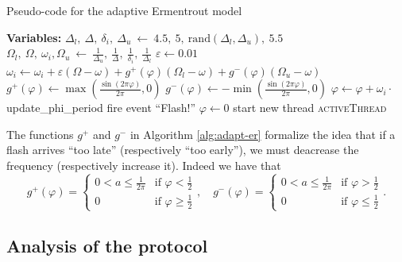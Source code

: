 \documentclass[a4paper, 11pt]{article}
\renewcommand{\epsilon}{\varepsilon}
\renewcommand{\phi}{\varphi}
\theoremstyle{plain}
\theoremstyle{definition}
\begin{document}
    \begin{algorithm}
     \caption{Pseudo-code for the adaptive Ermentrout model}
     \label{alg:adapt-er}
     \begin{algorithmic}
       \State \textbf{Variables:}
       \State $\Delta_l,\ \Delta,\ \delta_i,\ \Delta_u\ \gets\ 4.5,\ 5,\ \mathrm{rand}(\Delta_l, \Delta_u),\
       5.5$ 
       \State $\Omega_l,\ \Omega,\ \omega_i, \Omega_u\ \gets\ \frac{1}{\Delta_u},\ \frac{1}{\Delta},\
       \frac{1}{\delta_i},\ \frac{1}{\Delta_l}$
       \State $\epsilon \gets 0.01$
       \State
         \State $\omega_i \gets \omega_i + \epsilon(\Omega - \omega) + g^+(\phi)(\Omega_l - \omega) +
         g^-(\phi)(\Omega_u - \omega)$
       \EndFunction
       \State
       \State $g^+(\phi) \gets \max \left( \frac{\sin(2\pi \phi)}{2\pi}, 0 \right)$
       \State $g^-(\phi) \gets -\min \left( \frac{\sin(2\pi \phi)}{2\pi}, 0 \right)$
       \State
       \Function{updatePhi()}{}
         \If{$\phi < 1$}
           \State $\phi \gets \phi + \omega_i \cdot $update\_phi\_period
         \Else
           \State fire event ``Flash!''
           \State $\phi \gets 0$
           \State start new thread \textsc{activeThread}
         \EndIf
       \EndFunction
     \end{algorithmic}
   \end{algorithm}


   The functions $g^+$ and $g^-$ in Algorithm \ref{alg:adapt-er} formalize the idea that if a flash arrives ``too late'' (respectively ``too
   early''), we must deacrease the frequency (respectively increase it). Indeed we have that
   \[
   g^+(\phi) = 
   \begin{cases}
     0 < a \leq \frac{1}{2\pi} & \text{if } \phi < \frac{1}{2}\\
     0 & \text{if } \phi \geq \frac{1}{2}
   \end{cases},\quad
   g^-(\phi) = 
   \begin{cases}
     0 < a \leq \frac{1}{2\pi} & \text{if } \phi > \frac{1}{2}\\
     0 & \text{if } \phi \leq \frac{1}{2}
   \end{cases}.
   \]

   
    
   \subsection{Analysis of the protocol}
   \label{sec:analysis-protocol-er}
\end{document}
